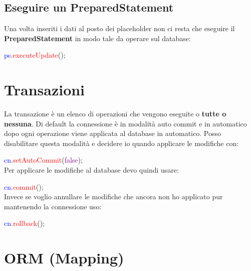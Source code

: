 \documentclass[11pt, letterpaper, titlepage]{article}
\begin{document}
\subsection{Eseguire un PreparedStatement}
Una volta inseriti i dati al posto dei placeholder non ci resta che eseguire il
\textbf{PreparedStatement} in modo tale da operare sul database:\par
\textcolor{blue}{ps}.\textcolor{red}{executeUpdate}();

\section{Transazioni}
La transazione è un elenco di operazioni che vengono eseguite o \textbf{tutte o nessuna}.
Di default la connessione è in modalità auto commit e in automatico dopo ogni operazione viene applicata al database
in automatico. Posso disabilitare questa modalità e decidere io quando applicare le modifiche con:\par
\textcolor{blue}{cn}.\textcolor{red}{setAutoCommit}(\textcolor{purple}{false});\\
Per applicare le modifiche al database devo quindi usare:\par
\textcolor{blue}{cn}.\textcolor{red}{commit}();\\
Invece se voglio annullare le modifiche che ancora non ho applicato pur mantenendo la connessione uso:\par
\textcolor{blue}{cn}.\textcolor{red}{rollback}();

\section{ORM (Mapping)}
\end{document}
